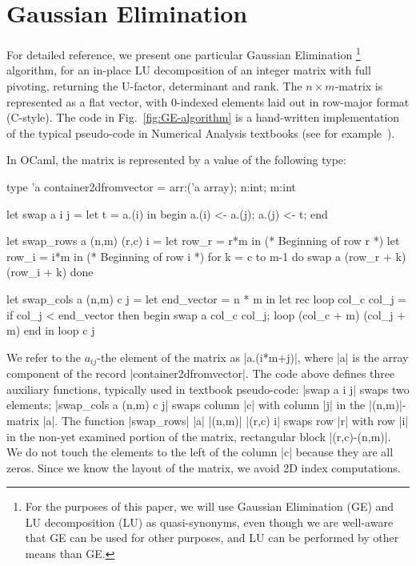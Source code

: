 \documentclass{elsart}
\begin{document}
\section{Gaussian Elimination}\label{GE-algorithm}

For detailed reference, we present one particular Gaussian Elimination%
\footnote{For the purposes of this paper, we will use Gaussian Elimination (GE)
and LU decomposition (LU) as quasi-synonyms, even though we are well-aware
that GE can be used for other purposes, and LU can be performed by other
means than GE.}
algorithm, for an in-place LU decomposition of an integer matrix with
full pivoting, returning the U-factor, determinant and rank. The
$n\times m$-matrix is represented as a flat vector, with 0-indexed
elements laid out in row-major format (C-style). The code in 
Fig.~\ref{fig:GE-algorithm} is
a hand-written implementation of the typical pseudo-code in
Numerical Analysis textbooks (see for example~\cite{BurdenFaires89}).

In OCaml, the matrix is represented by a value of the following type:
\begin{code}
type 'a container2dfromvector = {arr:('a array); n:int; m:int}

let swap a i j =
  let t = a.(i) in begin a.(i) <- a.(j); a.(j) <- t; end

let swap_rows a (n,m) (r,c) i =
  let row_r = r*m in                  (* Beginning of row r *)
  let row_i = i*m in                  (* Beginning of row i *)
  for k = c to m-1 do
    swap a (row_r + k) (row_i + k)
  done

let swap_cols a (n,m) c j =
  let end_vector = n * m in
  let rec loop col_c col_j =
    if col_j < end_vector then
      begin
        swap a col_c col_j;
        loop (col_c + m) (col_j + m)
      end
  in loop c j
\end{code}
We refer to the $a_{ij}$-the element of the matrix as |a.(i*m+j)|,
where |a| is the array component of the record |container2dfromvector|.
The code above defines three auxiliary functions, typically used in 
textbook pseudo-code: |swap a i j| swaps two elements; 
|swap_cols a (n,m) c j| swaps column |c| with column |j| in
the |(n,m)|-matrix |a|. The function 
|swap_rows| |a| |(n,m)| |(r,c) i| swaps row |r| with row |i| in 
the non-yet examined portion of the matrix, 
rectangular block |(r,c)-(n,m)|. We do not touch the 
elements to the left of the column |c| because they are all zeros. 
Since we know the layout of the matrix, we avoid 2D index
computations.
\end{document}
